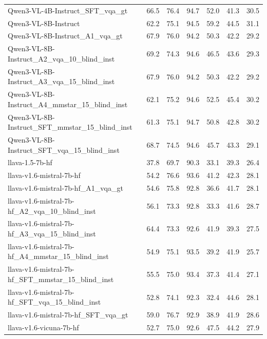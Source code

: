 \begin{tabular}{lrrrrrr}
Qwen3-VL-4B-Instruct_SFT_vqa_gt & 66.5 & 76.4 & 94.7 & 52.0 & 41.3 & 30.5 \\
Qwen3-VL-8B-Instruct & 62.2 & 75.1 & 94.5 & 59.2 & 44.5 & 31.1 \\
Qwen3-VL-8B-Instruct_A1_vqa_gt & 67.9 & 76.0 & 94.2 & 50.3 & 42.2 & 29.2 \\
Qwen3-VL-8B-Instruct_A2_vqa_10_blind_inst & 69.2 & 74.3 & 94.6 & 46.5 & 43.6 & 29.3 \\
Qwen3-VL-8B-Instruct_A3_vqa_15_blind_inst & 67.9 & 76.0 & 94.2 & 50.3 & 42.2 & 29.2 \\
Qwen3-VL-8B-Instruct_A4_mmstar_15_blind_inst & 62.1 & 75.2 & 94.6 & 52.5 & 45.4 & 30.2 \\
Qwen3-VL-8B-Instruct_SFT_mmstar_15_blind_inst & 61.3 & 75.1 & 94.7 & 50.8 & 42.8 & 30.2 \\
Qwen3-VL-8B-Instruct_SFT_vqa_15_blind_inst & 68.7 & 74.5 & 94.6 & 45.7 & 43.3 & 29.1 \\
llava-1.5-7b-hf & 37.8 & 69.7 & 90.3 & 33.1 & 39.3 & 26.4 \\
llava-v1.6-mistral-7b-hf & 54.2 & 76.6 & 93.6 & 41.2 & 42.3 & 28.1 \\
llava-v1.6-mistral-7b-hf_A1_vqa_gt & 54.6 & 75.8 & 92.8 & 36.6 & 41.7 & 28.1 \\
llava-v1.6-mistral-7b-hf_A2_vqa_10_blind_inst & 56.1 & 73.3 & 92.8 & 33.3 & 41.6 & 28.7 \\
llava-v1.6-mistral-7b-hf_A3_vqa_15_blind_inst & 64.4 & 73.3 & 92.6 & 41.9 & 39.3 & 27.5 \\
llava-v1.6-mistral-7b-hf_A4_mmstar_15_blind_inst & 54.9 & 75.1 & 93.5 & 39.2 & 41.9 & 25.7 \\
llava-v1.6-mistral-7b-hf_SFT_mmstar_15_blind_inst & 55.5 & 75.0 & 93.4 & 37.3 & 41.4 & 27.1 \\
llava-v1.6-mistral-7b-hf_SFT_vqa_15_blind_inst & 52.8 & 74.1 & 92.3 & 32.4 & 44.6 & 28.1 \\
llava-v1.6-mistral-7b-hf_SFT_vqa_gt & 59.0 & 76.7 & 92.9 & 38.9 & 41.9 & 28.6 \\
llava-v1.6-vicuna-7b-hf & 52.7 & 75.0 & 92.6 & 47.5 & 44.2 & 27.9 \\
\bottomrule
\end{tabular}
